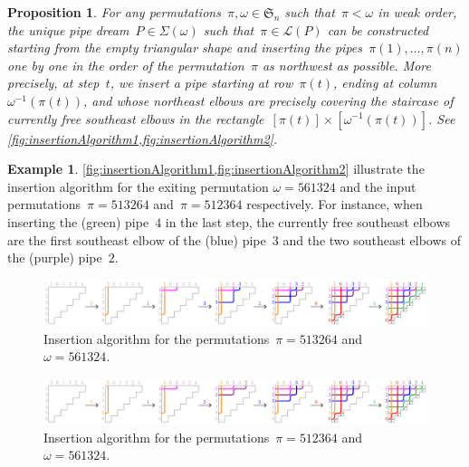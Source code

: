 \documentclass[reqno]{amsart}
\newtheorem{proposition}[theorem]{Proposition}
\theoremstyle{definition}
\newtheorem{example}[theorem]{Example}
\newcommand{\fS}{\mathfrak{S}} %
\newcommand{\acyclicPipeDreams}{\Sigma} %
\newcommand{\linearExtensions}{\mathcal{L}} %
\begin{document}
\begin{proposition}
\label{prop:insertionAlgorithm}
For any permutations~$\pi,\omega \in \fS_n$ such that~$\pi < \omega$ in weak order, the unique pipe dream~$P \in \acyclicPipeDreams(\omega)$ such that~$\pi \in \linearExtensions(P)$ can be constructed starting from the empty triangular shape and inserting the pipes~$\pi(1), \dots, \pi(n)$ one by one in the order of the permutation~$\pi$ as northwest as possible.
More precisely, at step~$t$, we insert a pipe starting at row~$\pi(t)$, ending at column~$\omega^{-1}(\pi(t))$, and whose northeast elbows are precisely covering the staircase of currently free southeast elbows in the rectangle~$[\pi(t)] \times [\omega^{-1}(\pi(t))]$.
See \cref{fig:insertionAlgorithm1,fig:insertionAlgorithm2}.
\end{proposition}

\begin{example}
\label{exm:insertionAlgorithm}
\cref{fig:insertionAlgorithm1,fig:insertionAlgorithm2} illustrate the insertion algorithm for the exiting permutation ${\omega = 561324}$ and the input permutations~${\pi = 513264}$ and~${\pi = 512364}$ respectively.
For instance, when inserting the (green) pipe~$4$ in the last step, the currently free southeast elbows are the first southeast elbow of the (blue) pipe~$3$ and the two southeast elbows of the (purple) pipe~$2$.
%
\begin{figure}[t]
	\centerline{\includegraphics[scale=.9]{insertion1}}
	\caption{Insertion algorithm for the permutations~$\pi = 513264$ and~$\omega = 561324$.}
	\label{fig:insertionAlgorithm1}
\end{figure}
%
\begin{figure}[t]
	\centerline{\includegraphics[scale=.9]{insertion2}}
	\caption{Insertion algorithm for the permutations~$\pi = 512364$ and~$\omega = 561324$.}
	\label{fig:insertionAlgorithm2}
\end{figure}
\end{example}
\end{document}
